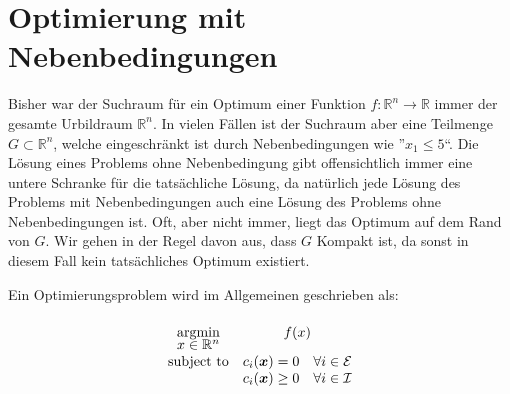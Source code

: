 \documentclass{report}
\newcommand{\argmin}[1] {
    \begin{array}{c}
        \vphantom{#1}\\[-3pt] %
        \text{argmin}\\[-3pt]
        #1\\
        \end{array}
    }
\newcommand*{\newpar}{\par\vspace{\baselineskip}\noindent}
\begin{document}
\chapter{Optimierung mit Nebenbedingungen}
Bisher war der Suchraum für ein Optimum einer Funktion $f: \mathbb{R}^n \to \mathbb{R}$ immer der gesamte Urbildraum $\mathbb{R}^n$. In vielen Fällen ist der Suchraum aber eine Teilmenge $G \subset \mathbb{R}^n$, welche eingeschränkt ist durch Nebenbedingungen wie ''$x_1 \leq 5$``. Die Lösung eines Problems ohne Nebenbedingung gibt offensichtlich immer eine untere Schranke für die tatsächliche Lösung, da natürlich jede Lösung des Problems mit Nebenbedingungen auch eine Lösung des Problems ohne Nebenbedingungen ist. Oft, aber nicht immer, liegt das Optimum auf dem Rand von $G$. Wir gehen in der Regel davon aus, dass $G$ Kompakt ist, da sonst in diesem Fall kein tatsächliches Optimum existiert.
\newpar
Ein Optimierungsproblem wird im Allgemeinen geschrieben als:
\begin{align*}
\begin{array}{cc}
\argmin{x \in \mathbb{R}^n} &f(x)\\
 \text{subject to} &c_i(\bm{x}) = 0 \quad \forall i \in \mathcal{E}\\
 &c_i(\bm{x}) \geq 0 \quad \forall i \in \mathcal{I}\\
\end{array}
\end{align*}
%
\end{document}
